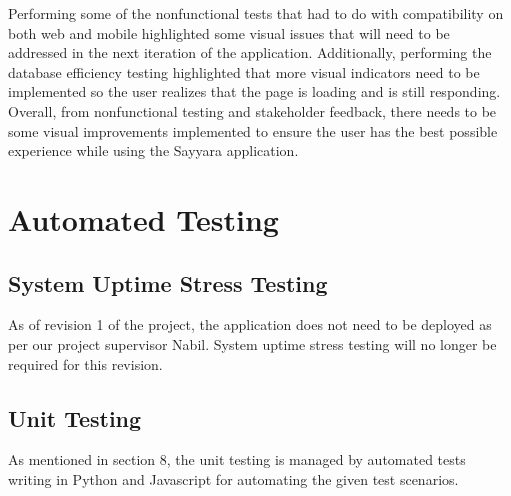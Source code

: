 \documentclass[12pt, titlepage]{article}
\begin{document}
Performing some of the nonfunctional tests that had to do with compatibility on both web and mobile highlighted some visual issues that 
will need to be addressed in the next iteration of the application. Additionally, performing the database efficiency testing highlighted 
that more visual indicators need to be implemented so the user realizes that the page is loading and is still responding. Overall, from 
nonfunctional testing and stakeholder feedback, there needs to be some visual improvements implemented to ensure the user has the best 
possible experience while using the Sayyara application.

\section{Automated Testing}

\subsection{System Uptime Stress Testing}

As of revision 1 of the project, the application does not need to be deployed as per our project supervisor Nabil. System uptime stress testing will no longer be required for this revision.

\subsection{Unit Testing}

As mentioned in section 8, the unit testing is managed by automated tests writing in Python and Javascript for automating the given test scenarios.
\end{document}
